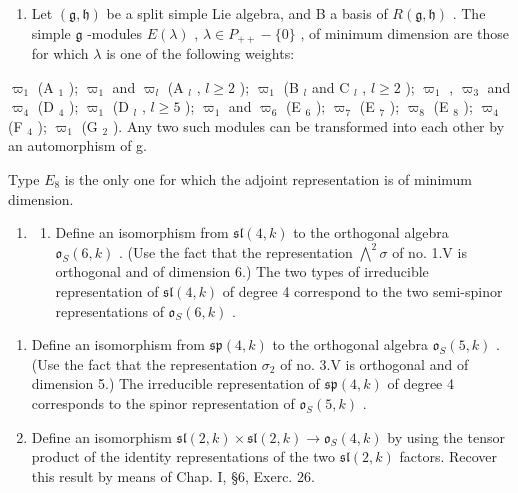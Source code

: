 \begin{enumerate}
\def\labelenumi{\arabic{enumi})}
\setcounter{enumi}{1}
\tightlist
\item
  Let \((\mathfrak{g},\mathfrak{h})\) be a split simple Lie algebra, and B a basis of \(R(\mathfrak{g},\mathfrak{h})\) . The simple \(\mathfrak{g}\) -modules \(E(\lambda)\) , \(\lambda \in P_{++} - \{0\}\) , of minimum dimension are those for which \(\lambda\) is one of the following weights:
\end{enumerate}

\(\varpi_{1}\) (A \(_{1}\) ); \(\varpi_{1}\) and \(\varpi_{l}\) (A \(_{l}\) , \(l \geq 2\) ); \(\varpi_{1}\) (B \(_{l}\) and C \(_{l}\) , \(l \geq 2\) ); \(\varpi_{1}\) , \(\varpi_{3}\) and \(\varpi_{4}\) (D \(_{4}\) ); \(\varpi_{1}\) (D \(_{l}\) , \(l \geq 5\) ); \(\varpi_{1}\) and \(\varpi_{6}\) (E \(_{6}\) ); \(\varpi_{7}\) (E \(_{7}\) ); \(\varpi_{8}\) (E \(_{8}\) ); \(\varpi_{4}\) (F \(_{4}\) ); \(\varpi_{1}\) (G \(_{2}\) ). Any two such modules can be transformed into each other by an automorphism of g.

Type \(E_{8}\) is the only one for which the adjoint representation is of minimum dimension.

\begin{enumerate}
\def\labelenumi{\arabic{enumi})}
\setcounter{enumi}{2}
\tightlist
\item
  \begin{enumerate}
  \def\labelenumii{\alph{enumii})}
  \tightlist
  \item
    Define an isomorphism from \(\mathfrak{sl}(4,k)\) to the orthogonal algebra \(\mathfrak{o}_S(6,k)\) . (Use the fact that the representation \(\bigwedge^2\sigma\) of no. 1.V is orthogonal and of dimension 6.) The two types of irreducible representation of \(\mathfrak{sl}(4,k)\) of degree 4 correspond to the two semi-spinor representations of \(\mathfrak{o}_S(6,k)\) .
  \end{enumerate}
\end{enumerate}

\begin{enumerate}
\def\labelenumi{\alph{enumi})}
\setcounter{enumi}{1}
\item
  Define an isomorphism from \(\mathfrak{sp}(4,k)\) to the orthogonal algebra \(\mathfrak{o}_S(5,k)\) . (Use the fact that the representation \(\sigma_2\) of no. 3.V is orthogonal and of dimension 5.) The irreducible representation of \(\mathfrak{sp}(4,k)\) of degree 4 corresponds to the spinor representation of \(\mathfrak{o}_S(5,k)\) .
\item
  Define an isomorphism \(\mathfrak{sl}(2,k)\times\mathfrak{sl}(2,k)\to\mathfrak{o}_{S}(4,k)\) by using the tensor product of the identity representations of the two \(\mathfrak{sl}(2,k)\) factors. Recover this result by means of Chap. I, §6, Exerc. 26.
\end{enumerate}


